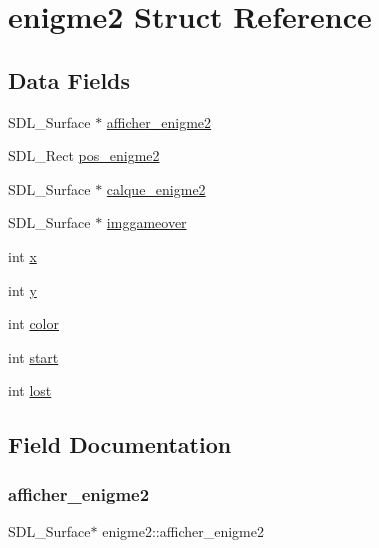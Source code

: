 \hypertarget{structenigme2}{}\section{enigme2 Struct Reference}
\label{structenigme2}
\subsection*{Data Fields}
\begin{DoxyCompactItemize}
\item 
S\+D\+L\+\_\+\+Surface $\ast$ \hyperlink{structenigme2_a7f54dfe9eeab40810eab226a12fa2208}{afficher\+\_\+enigme2}
\item 
S\+D\+L\+\_\+\+Rect \hyperlink{structenigme2_a0b945b1fae00493bccfb8c2b16ee2b78}{pos\+\_\+enigme2}
\item 
S\+D\+L\+\_\+\+Surface $\ast$ \hyperlink{structenigme2_aafa4500b064319895e2eb03c24cc1a8a}{calque\+\_\+enigme2}
\item 
S\+D\+L\+\_\+\+Surface $\ast$ \hyperlink{structenigme2_ae0469410e9ec8e60cf0204252cca0b82}{imggameover}
\item 
int \hyperlink{structenigme2_a422d435047e30ae7577a8e238f61668e}{x}
\item 
int \hyperlink{structenigme2_aac3138bd43564620b75c50bf20125fca}{y}
\item 
int \hyperlink{structenigme2_aed1d6a6bbdfbbeb0d6ac98046d92add1}{color}
\item 
int \hyperlink{structenigme2_a46fc61f86e8d3f8a331a221985058b82}{start}
\item 
int \hyperlink{structenigme2_a66e610e52aa383391ba8198a25b21caa}{lost}
\end{DoxyCompactItemize}


\subsection{Field Documentation}
\mbox{\label{structenigme2_a7f54dfe9eeab40810eab226a12fa2208}} 
\subsubsection{\texorpdfstring{afficher\+\_\+enigme2}{afficher\_enigme2}}
{\footnotesize\ttfamily S\+D\+L\+\_\+\+Surface$\ast$ enigme2\+::afficher\+\_\+enigme2}

